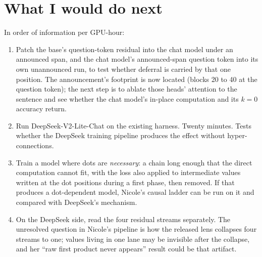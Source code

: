 \documentclass[11pt]{article}
\begin{document}
\section{What I would do next}

In order of information per GPU-hour:

\begin{enumerate}
\item Patch the base's question-token residual into the chat model under an announced span, and the chat model's announced-span question token into its own unannounced run, to test whether deferral is carried by that one position. The announcement's footprint is now located (blocks 20 to 40 at the question token); the next step is to ablate those heads' attention to the sentence and see whether the chat model's in-place computation and its $k=0$ accuracy return.
\item Run DeepSeek-V2-Lite-Chat on the existing harness. Twenty minutes. Tests whether the DeepSeek training pipeline produces the effect without hyper-connections.
\item Train a model where dots are \emph{necessary}: a chain long enough that the direct computation cannot fit, with the loss also applied to intermediate values written at the dot positions during a first phase, then removed. If that produces a dot-dependent model, Nicole's causal ladder can be run on it and compared with DeepSeek's mechanism.
\item On the DeepSeek side, read the four residual streams separately. The unresolved question in Nicole's pipeline is how the released lens collapses four streams to one; values living in one lane may be invisible after the collapse, and her ``raw first product never appears'' result could be that artifact.
\end{enumerate}

\appendix
\end{document}
